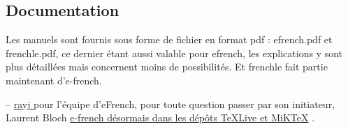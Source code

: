 \documentclass[11pt,a4paper]{article}
\begin{document}
\subsection*{Documentation }

Les manuels sont fournis sous forme de fichier en format pdf : 
efrench.pdf et frenchle.pdf, ce dernier étant aussi valable
pour efrench, les explications y sont plus détaillées 
mais concernent moins de possibilités. Et frenchle 
fait partie maintenant d'e-french.



  -- \href{mailto:raymond@juil.ch}{rayj }
pour l'équipe d'eFrench, pour toute question passer par son initiateur,
{Laurent Bloch}
\href{https://www.laurentbloch.net/MySpip3/e-french-desormais-dans-les-depots?lang=fr}{e-french désormais dans les dépôts TeXLive et MiKTeX} .
\end{document}
